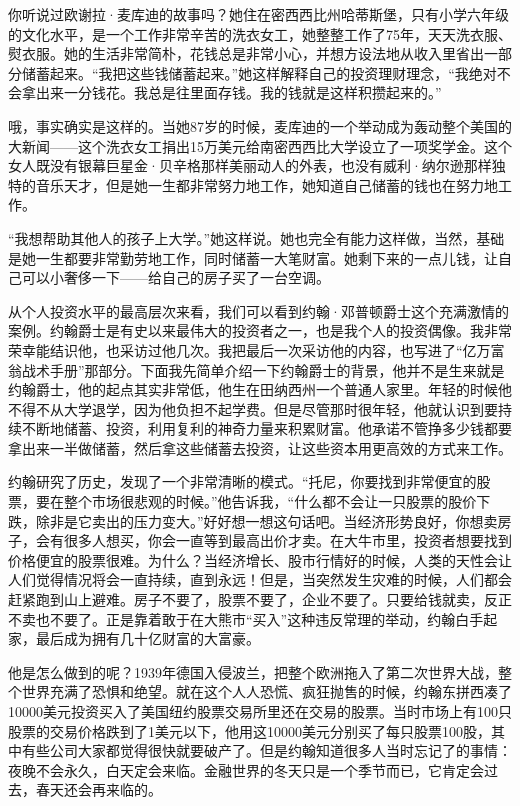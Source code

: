 你听说过欧谢拉·麦库迪的故事吗？她住在密西西比州哈蒂斯堡，只有小学六年级的文化水平，是一个工作非常辛苦的洗衣女工，她整整工作了75年，天天洗衣服、熨衣服。她的生活非常简朴，花钱总是非常小心，并想方设法地从收入里省出一部分储蓄起来。“我把这些钱储蓄起来。”她这样解释自己的投资理财理念，“我绝对不会拿出来一分钱花。我总是往里面存钱。我的钱就是这样积攒起来的。”

哦，事实确实是这样的。当她87岁的时候，麦库迪的一个举动成为轰动整个美国的大新闻——这个洗衣女工捐出15万美元给南密西西比大学设立了一项奖学金。这个女人既没有银幕巨星金·贝辛格那样美丽动人的外表，也没有威利·纳尔逊那样独特的音乐天才，但是她一生都非常努力地工作，她知道自己储蓄的钱也在努力地工作。

“我想帮助其他人的孩子上大学。”她这样说。她也完全有能力这样做，当然，基础是她一生都要非常勤劳地工作，同时储蓄一大笔财富。她剩下来的一点儿钱，让自己可以小奢侈一下——给自己的房子买了一台空调。

从个人投资水平的最高层次来看，我们可以看到约翰·邓普顿爵士这个充满激情的案例。约翰爵士是有史以来最伟大的投资者之一，也是我个人的投资偶像。我非常荣幸能结识他，也采访过他几次。我把最后一次采访他的内容，也写进了“亿万富翁战术手册”那部分。下面我先简单介绍一下约翰爵士的背景，他并不是生来就是约翰爵士，他的起点其实非常低，他生在田纳西州一个普通人家里。年轻的时候他不得不从大学退学，因为他负担不起学费。但是尽管那时很年轻，他就认识到要持续不断地储蓄、投资，利用复利的神奇力量来积累财富。他承诺不管挣多少钱都要拿出来一半做储蓄，然后拿这些储蓄去投资，让这些资本用更高效的方式来工作。

约翰研究了历史，发现了一个非常清晰的模式。“托尼，你要找到非常便宜的股票，要在整个市场很悲观的时候。”他告诉我，“什么都不会让一只股票的股价下跌，除非是它卖出的压力变大。”好好想一想这句话吧。当经济形势良好，你想卖房子，会有很多人想买，你会一直等到最高出价才卖。在大牛市里，投资者想要找到价格便宜的股票很难。为什么？当经济增长、股市行情好的时候，人类的天性会让人们觉得情况将会一直持续，直到永远！但是，当突然发生灾难的时候，人们都会赶紧跑到山上避难。房子不要了，股票不要了，企业不要了。只要给钱就卖，反正不卖也不要了。正是靠着敢于在大熊市“买入”这种违反常理的举动，约翰白手起家，最后成为拥有几十亿财富的大富豪。

他是怎么做到的呢？1939年德国入侵波兰，把整个欧洲拖入了第二次世界大战，整个世界充满了恐惧和绝望。就在这个人人恐慌、疯狂抛售的时候，约翰东拼西凑了10000美元投资买入了美国纽约股票交易所里还在交易的股票。当时市场上有100只股票的交易价格跌到了1美元以下，他用这10000美元分别买了每只股票100股，其中有些公司大家都觉得很快就要破产了。但是约翰知道很多人当时忘记了的事情：夜晚不会永久，白天定会来临。金融世界的冬天只是一个季节而已，它肯定会过去，春天还会再来临的。

